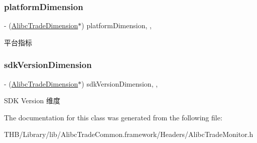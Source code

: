 \subsubsection{\texorpdfstring{platform\+Dimension}{platformDimension}}
{\footnotesize\ttfamily -\/ (\mbox{\hyperlink{interface_alibc_trade_dimension}{Alibc\+Trade\+Dimension}}$\ast$) platform\+Dimension\hspace{0.3cm}{\ttfamily [read]}, {\ttfamily [nonatomic]}, {\ttfamily [strong]}}

平台指标 \mbox{\label{interface_alibc_trade_monitor_a9e907925d76d671b54618341b695a607}} 
\subsubsection{\texorpdfstring{sdk\+Version\+Dimension}{sdkVersionDimension}}
{\footnotesize\ttfamily -\/ (\mbox{\hyperlink{interface_alibc_trade_dimension}{Alibc\+Trade\+Dimension}}$\ast$) sdk\+Version\+Dimension\hspace{0.3cm}{\ttfamily [read]}, {\ttfamily [nonatomic]}, {\ttfamily [strong]}}

S\+DK Version 维度 

The documentation for this class was generated from the following file\+:\begin{DoxyCompactItemize}
\item 
T\+H\+B/\+Library/lib/\+Alibc\+Trade\+Common.\+framework/\+Headers/Alibc\+Trade\+Monitor.\+h\end{DoxyCompactItemize}

